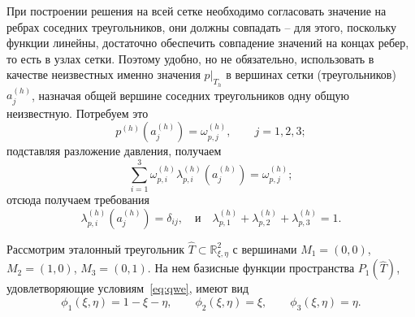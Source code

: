 \documentclass[a4paper,14pt]{extarticle}
\begin{document}
	При построении решения на всей сетке необходимо согласовать значение на ребрах соседних треугольников, они должны совпадать -- для этого, поскольку функции линейны, достаточно обеспечить совпадение значений на концах ребер, то есть в узлах сетки. Поэтому удобно, но не обязательно, использовать в качестве неизвестных именно значения $p|_{T_h}$ в вершинах сетки (треугольников) $a_j^{(h)}$, назначая общей вершине соседних треугольников одну общую неизвестную.
	Потребуем это
	\begin{equation}
	p^{(h)}(a_j^{(h)})=\omega_{p,j}^{(h)},\qquad j=1,2,3;
	\end{equation}
	подставляя разложение давления, получаем
	\begin{equation}
	\sum_{i=1}^{3}\omega_{p,i}^{(h)}\lambda_{p,i}^{(h)}(a_j^{(h)})
	=\omega_{p,j}^{(h)};
	\end{equation}
	отсюда получаем требования
	\begin{equation}
		\lambda_{p,i}^{(h)}(a_j^{(h)})=\delta_{ij},\quad \text{и} \quad
		\lambda_{p,1}^{(h)}+	\lambda_{p,2}^{(h)}+	\lambda_{p,3}^{(h)} = 1.
	\label{eq:qwe}
	\end{equation}
	
	\begin{tcolorbox}
		Рассмотрим эталонный треугольник
		$\widehat{T}\subset\mathbb{R}^2_{\xi,\eta}$
		с вершинами
		$M_1=(0,0)$, $M_2=(1,0)$, $M_3=(0,1)$.
		На нем базисные функции
		пространства $P_1(\widehat{T})$,
		удовлетворяющие условиям~\eqref{eq:qwe},
		имеют вид
		\begin{equation}
			\phi_1(\xi,\eta)=1-\xi-\eta,\qquad
			\phi_2(\xi,\eta)=\xi,\qquad
			\phi_3(\xi,\eta)=\eta.
		\end{equation}
	\end{tcolorbox}
	
\end{document}
